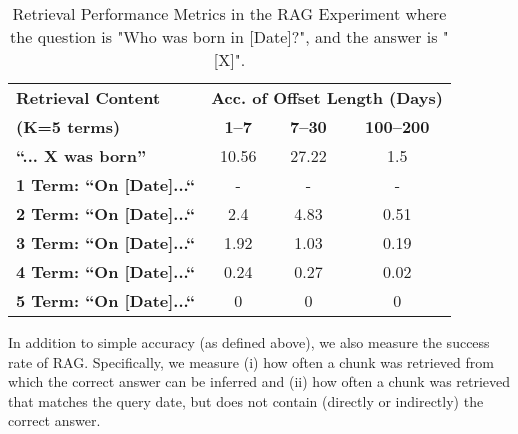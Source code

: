 \documentclass[11pt]{article}
\begin{document}
\begin{table}[ht]
\centering
\caption{Retrieval Performance Metrics in the RAG Experiment where the question is "Who was born in [Date]?", and the answer is "[X]".}
\label{tab:rag-retrieval}
\begin{tabular}{l|ccc}
\hline
\textbf{Retrieval Content } & \multicolumn{3}{c}{\small{\textbf{Acc. of Offset Length (Days)}}} \\
\cline{2-4}
\small{\textbf{(K=5 terms)}}  & \textbf{1--7 }  & \textbf{7--30 } & \textbf{100--200 } \\
\hline
\textbf{``... X was born''} & 10.56 & 27.22 & 1.5 \\
\small{\textbf{1 Term: ``On [Date]...``}} & - & - & - \\
\small{\textbf{2 Term: ``On [Date]...``}} & 2.4 & 4.83 & 0.51 \\
\small{\textbf{3 Term: ``On [Date]...``}} & 1.92 & 1.03 & 0.19 \\
\small{\textbf{4 Term: ``On [Date]...``}} & 0.24 & 0.27 & 0.02 \\
\small{\textbf{5 Term: ``On [Date]...``}} & 0 & 0 & 0 \\
\hline
\end{tabular}
\end{table}

In addition to simple accuracy (as defined above), we also
measure the success rate of RAG. Specifically, we measure
(i) how often a chunk was retrieved from which the correct answer can be inferred
and (ii) how often a chunk was retrieved that matches the
query date, but does not contain (directly or indirectly)
the correct answer.

\end{document}
